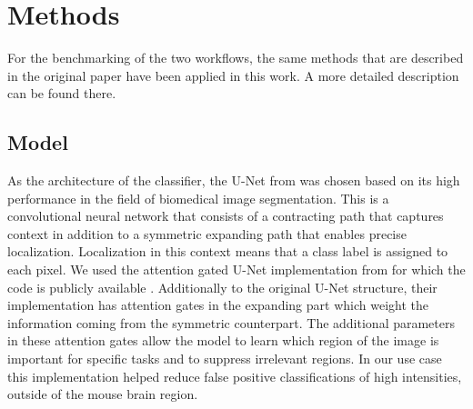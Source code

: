 \section{Methods}\label{sec:methods}
For the benchmarking of the two workflows, the same methods that are described in the original paper have been applied in this work.
A more detailed description can be found there.

\begin{sansmath}
\end{sansmath}

\subsection{Model}
As the architecture of the classifier, the U-Net from \cite{ronneberger_u-net:_2015} was chosen based on its high performance in the field of biomedical image segmentation.
This is a convolutional neural network that consists of a contracting path that captures context in addition to a symmetric expanding path that enables precise localization.
Localization in this context means that a class label is assigned to each pixel.
We used the attention gated U-Net implementation from \cite{oktay_attention} for which the code is publicly available \citep{oktay_ozan-oktayattention-gated-networks_2020}.
Additionally to the original U-Net structure, their implementation has attention gates in the expanding part which weight the information coming from the symmetric counterpart.
The additional parameters in these attention gates allow the model to learn which region of the image is important for specific tasks and to suppress irrelevant regions.
In our use case this implementation helped reduce false positive classifications of high intensities, outside of the mouse brain region.

